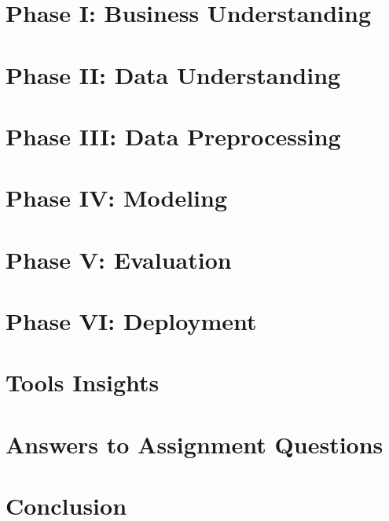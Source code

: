 \documentclass[12pt,a4paper,notitlepage]{report}
\begin{document}





\tableofcontents
\clearpage
{}

\chapter{Phase I: Business Understanding}


\chapter{Phase II: Data Understanding}


\chapter{Phase III: Data Preprocessing}


\chapter{Phase IV: Modeling}


\chapter{Phase V: Evaluation}


\chapter{Phase VI: Deployment}


\chapter{Tools Insights}



\chapter{Answers to Assignment Questions}



\chapter{Conclusion}


\printbibliography
\end{document}
